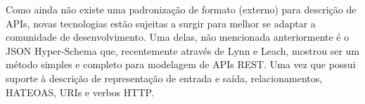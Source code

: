 Como ainda não existe uma padronização de formato (externo) para descrição de APIs, novas tecnologias estão sujeitas a surgir para melhor se adaptar a comunidade de desenvolvimento. Uma delas, não mencionada anteriormente é o JSON Hyper-Schema que, recentemente através de Lynn e Leach, mostrou ser um método simples e completo para modelagem de APIs REST. Uma vez que possui suporte à descrição de representação de entrada e saída, relacionamentos, HATEOAS, URIs e verbos HTTP. \cite{LynnEtAl2016,Leach2014}
